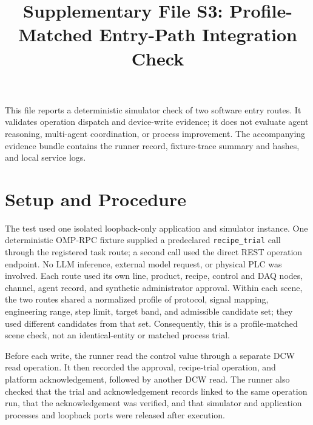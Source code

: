 \documentclass[10pt]{article}
\title{Supplementary File S3: Profile-Matched Entry-Path Integration Check}
\author{}
\date{}
\begin{document}
\maketitle

This file reports a deterministic simulator check of two software entry
routes. It validates operation dispatch and device-write evidence; it does not
evaluate agent reasoning, multi-agent coordination, or process improvement.
The accompanying evidence bundle contains the runner record, fixture-trace
summary and hashes, and local service logs.

\section{Setup and Procedure}
The test used one isolated loopback-only application and simulator instance.
One deterministic OMP-RPC fixture supplied a predeclared \texttt{recipe\_trial}
call through the registered task route; a second call used the direct REST
operation endpoint. No LLM inference, external model request, or physical PLC
was involved. Each route used its own line, product, recipe, control and DAQ
nodes, channel, agent record, and synthetic administrator approval. Within
each scene, the two routes shared a normalized profile of protocol, signal
mapping, engineering range, step limit, target band, and admissible candidate
set; they used different candidates from that set. Consequently, this is a
profile-matched scene check, not an identical-entity or matched process trial.

Before each write, the runner read the control value through a separate DCW
read operation. It then recorded the approval, recipe-trial operation, and
platform acknowledgement, followed by another DCW read. The runner also
checked that the trial and acknowledgement records linked to the same
operation run, that the acknowledgement was verified, and that simulator and
application processes and loopback ports were released after execution.
\end{document}
